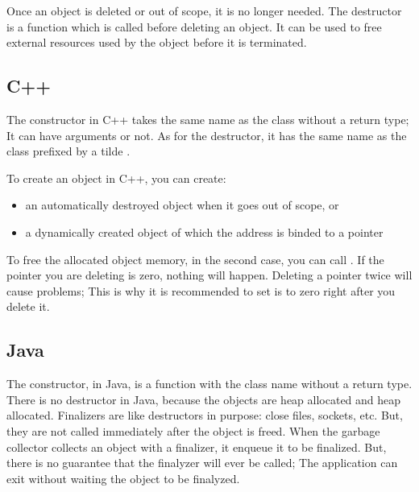 \documentclass{KodeBook}
\begin{document}
Once an object is deleted or out of scope, it is no longer needed. 
The destructor is a function which is called before deleting an object.
It can be used to free external resources used by the object before it is terminated.

\subsection{C++}

The constructor in C++ takes the same name as the class without a return type;
It can have arguments or not.
As for the destructor, it has the same name as the class prefixed by a tilde .



To create an object in C++, you can create:
\begin{itemize}
	\item an automatically destroyed object when it goes out of scope, or
	\item a dynamically created object of which the address is binded to a pointer
\end{itemize}



To free the allocated object memory, in the second case, you can call . 
If the pointer you are deleting is zero, nothing will happen. 
Deleting a pointer twice will cause problems; This is why it is recommended to set is to zero right after you delete it.



\subsection{Java}

The constructor, in Java, is a function with the class name without a return type.
There is no destructor in Java, because the objects are heap allocated and heap allocated. 
Finalizers are like destructors in purpose: close files, sockets, etc. 
But, they are not called immediately after the object is freed. 
When the garbage collector collects an object with a finalizer, it enqueue it to be finalized. 
But, there is no guarantee that the finalyzer will ever be called; The application can exit without waiting the object to be finalyzed. 
\end{document}
